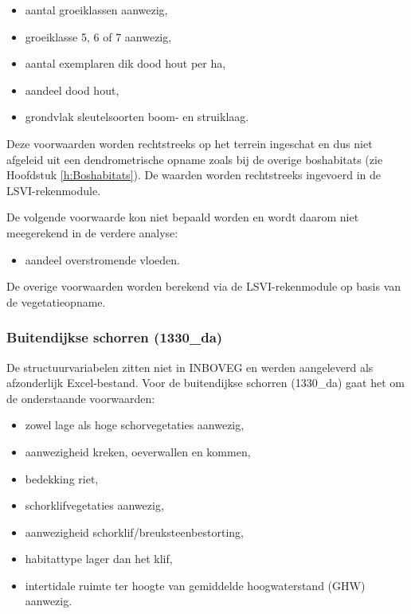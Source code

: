 \documentclass[twoside]{extreport}
\begin{document}
\begin{itemize}
\tightlist
\item
  aantal groeiklassen aanwezig,
\item
  groeiklasse 5, 6 of 7 aanwezig,
\item
  aantal exemplaren dik dood hout per ha,
\item
  aandeel dood hout,
\item
  grondvlak sleutelsoorten boom- en struiklaag.
\end{itemize}

Deze voorwaarden worden rechtstreeks op het terrein ingeschat en dus
niet afgeleid uit een dendrometrische opname zoals bij de overige
boshabitats (zie Hoofdstuk \ref{h:Boshabitats}). De waarden worden
rechtstreeks ingevoerd in de LSVI-rekenmodule.

De volgende voorwaarde kon niet bepaald worden en wordt daarom niet
meegerekend in de verdere analyse:

\begin{itemize}
\tightlist
\item
  aandeel overstromende vloeden.
\end{itemize}

De overige voorwaarden worden berekend via de LSVI-rekenmodule op basis
van de vegetatieopname.

\needspace{70mm}

\subsubsection{Buitendijkse schorren
(1330\_da)}\label{buitendijkse-schorren-1330_da}

De structuurvariabelen zitten niet in INBOVEG en werden aangeleverd als
afzonderlijk Excel-bestand. Voor de buitendijkse schorren (1330\_da)
gaat het om de onderstaande voorwaarden:

\begin{itemize}
\tightlist
\item
  zowel lage als hoge schorvegetaties aanwezig,
\item
  aanwezigheid kreken, oeverwallen en kommen,
\item
  bedekking riet,
\item
  schorklifvegetaties aanwezig,
\item
  aanwezigheid schorklif/breuksteenbestorting,
\item
  habitattype lager dan het klif,
\item
  intertidale ruimte ter hoogte van gemiddelde hoogwaterstand (GHW)
  aanwezig.
\end{itemize}
\end{document}
